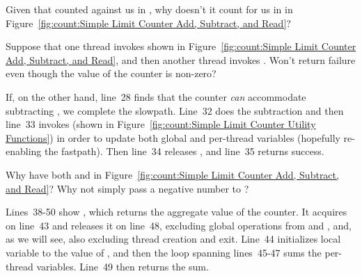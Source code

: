 \QuickQuiz{}
	Given that  counted against us in ,
	why doesn't it count for us in  in
	Figure~\ref{fig:count:Simple Limit Counter Add, Subtract, and Read}?
 \QuickQuizEnd

\QuickQuiz{}
	Suppose that one thread invokes  shown in
	Figure~\ref{fig:count:Simple Limit Counter Add, Subtract, and Read},
	and then another thread invokes .
	Won't  return failure even though the value of
	the counter is non-zero?
 \QuickQuizEnd

If, on the other hand, line~28 finds that the counter \emph{can}
accommodate subtracting , we complete the slowpath.
Line~32 does the subtraction and then
line~33 invokes  (shown in
Figure~\ref{fig:count:Simple Limit Counter Utility Functions})
in order to update both global and per-thread variables
(hopefully re-enabling the fastpath).
Then line~34 releases , and line~35 returns success.

\QuickQuiz{}
	Why have both  and  in
	Figure~\ref{fig:count:Simple Limit Counter Add, Subtract, and Read}?
	Why not simply pass a negative number to ?
 \QuickQuizEnd

Lines~38-50 show , which returns the aggregate value
of the counter.
It acquires  on line~43 and releases it on line~48,
excluding global operations from  and ,
and, as we will see, also excluding thread creation and exit.
Line~44 initializes local variable  to the value of
, and then the loop spanning lines~45-47 sums the
per-thread  variables.
Line~49 then returns the sum.

